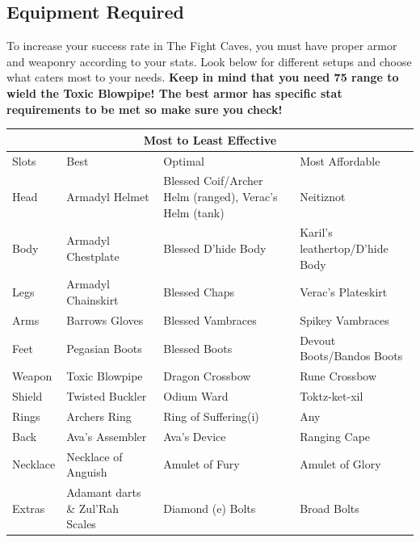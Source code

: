 \documentclass{article}
\begin{document}
\subsection{Equipment Required}
To increase your success rate in The Fight Caves, you must have proper armor and weaponry according to your stats. Look below for different setups and choose what caters most to your needs. \textbf{Keep in mind that you need 75 range to wield the Toxic Blowpipe! The best armor has specific stat requirements to be met so make sure you check!} 
\begin{center}
\setlength{\arrayrulewidth}{1mm}
\setlength{\tabcolsep}{14pt}
\renewcommand{\arraystretch}{1}
{
\begin{longtable}{ |p{1cm}|p{2cm}|p{2cm}|p{2cm}| }
\hline
\multicolumn{4}{|c|}{Most to Least Effective} \\
\hline
Slots & Best & Optimal & Most Affordable \\
\hline
Head & Armadyl Helmet & Blessed Coif/Archer Helm (ranged), Verac's Helm (tank) & Neitiznot \\
\hline
Body & Armadyl Chestplate & Blessed D'hide Body & Karil's leathertop/D'hide Body \\
\hline
Legs & Armadyl Chainskirt & Blessed Chaps & Verac's Plateskirt  \\
\hline
\endfirsthead
Arms & Barrows Gloves & Blessed Vambraces & Spikey Vambraces\\
\hline
Feet & Pegasian Boots & Blessed Boots & Devout Boots/Bandos Boots \\
\hline
Weapon & Toxic Blowpipe & Dragon Crossbow & Rune Crossbow \\

Shield & Twisted Buckler & Odium Ward & Toktz-ket-xil\\
\hline
Rings & Archers Ring & Ring of Suffering(i) & Any \\
\hline
Back & Ava's Assembler & Ava's Device & Ranging Cape \\
\hline
Necklace & Necklace of Anguish & Amulet of Fury & Amulet of Glory \\

Extras & Adamant darts \& Zul'Rah Scales & Diamond (e) Bolts & Broad Bolts \\
\hline
\end{longtable}
}
\end{center}
\vspace{2mm}
\end{document}
